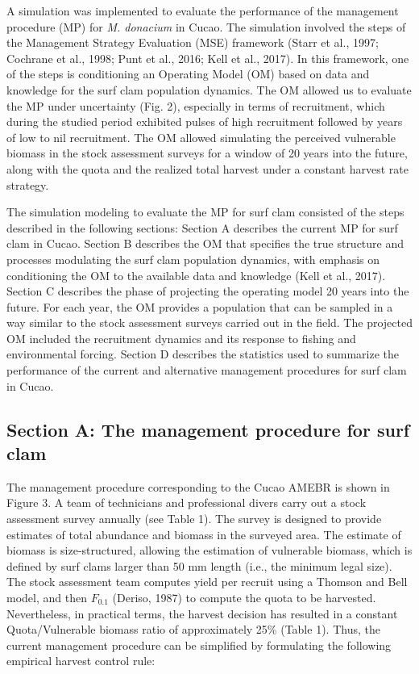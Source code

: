 \documentclass[12pt]{article}
\begin{document}
A simulation was implemented to evaluate the performance of the
management procedure (MP) for \emph{M. donacium} in Cucao. The
simulation involved the steps of the Management Strategy Evaluation
(MSE) framework (Starr et al., 1997; Cochrane et al., 1998; Punt et al.,
2016; Kell et al., 2017). In this framework, one of the steps is
conditioning an Operating Model (OM) based on data and knowledge for the
surf clam population dynamics. The OM allowed us to evaluate the MP
under uncertainty (Fig. 2), especially in terms of recruitment, which
during the studied period exhibited pulses of high recruitment followed
by years of low to nil recruitment. The OM allowed simulating the
perceived vulnerable biomass in the stock assessment surveys for a
window of 20 years into the future, along with the quota and the
realized total harvest under a constant harvest rate strategy.

The simulation modeling to evaluate the MP for surf clam consisted of
the steps described in the following sections: Section A describes the
current MP for surf clam in Cucao. Section B describes the OM that
specifies the true structure and processes modulating the surf clam
population dynamics, with emphasis on conditioning the OM to the
available data and knowledge (Kell et al., 2017). Section C describes
the phase of projecting the operating model 20 years into the future.
For each year, the OM provides a population that can be sampled in a way
similar to the stock assessment surveys carried out in the field. The
projected OM included the recruitment dynamics and its response to
fishing and environmental forcing. Section D describes the statistics
used to summarize the performance of the current and alternative
management procedures for surf clam in Cucao.

\hypertarget{section-a-the-management-procedure-for-surf-clam}{%
\subsection{Section A: The management procedure for surf
clam}\label{section-a-the-management-procedure-for-surf-clam}}

The management procedure corresponding to the Cucao AMEBR is shown in
Figure 3. A team of technicians and professional divers carry out a
stock assessment survey annually (see Table 1). The survey is designed
to provide estimates of total abundance and biomass in the surveyed
area. The estimate of biomass is size-structured, allowing the
estimation of vulnerable biomass, which is defined by surf clams larger
than 50 mm length (i.e., the minimum legal size). The stock assessment
team computes yield per recruit using a Thomson and Bell model, and then
\(F_{0.1}\) (Deriso, 1987) to compute the quota to be harvested.
Nevertheless, in practical terms, the harvest decision has resulted in a
constant Quota/Vulnerable biomass ratio of approximately 25\% (Table 1).
Thus, the current management procedure can be simplified by formulating
the following empirical harvest control rule:
\end{document}
